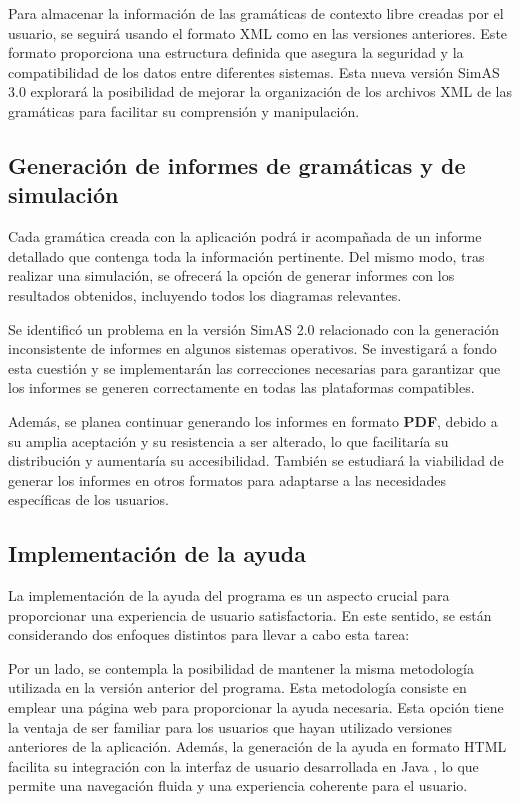 Para almacenar la información de las gramáticas de contexto libre creadas por el usuario, se seguirá usando el formato XML \cite{xml} como en las versiones anteriores. Este formato proporciona una estructura definida que asegura la seguridad y la compatibilidad de los datos entre diferentes sistemas. Esta nueva versión SimAS 3.0 explorará la posibilidad de mejorar la organización de los archivos XML de las gramáticas para facilitar su comprensión y manipulación.

\subsection{Generación de informes de gramáticas y de simulación}

Cada gramática creada con la aplicación podrá ir acompañada de un informe detallado que contenga toda la información pertinente. Del mismo modo, tras realizar una simulación, se ofrecerá la opción de generar informes con los resultados obtenidos, incluyendo todos los diagramas relevantes.

Se identificó un problema en la versión SimAS 2.0 relacionado con la generación inconsistente de informes en algunos sistemas operativos. Se investigará a fondo esta cuestión y se implementarán las correcciones necesarias para garantizar que los informes se generen correctamente en todas las plataformas compatibles. 

Además, se planea continuar generando los informes en formato \textbf{PDF}, debido a su amplia aceptación y su resistencia a ser alterado, lo que facilitaría su distribución y aumentaría su accesibilidad. También se estudiará la viabilidad de generar los informes en otros formatos para adaptarse a las necesidades específicas de los usuarios.

\subsection{Implementación de la ayuda}

La implementación de la ayuda del programa es un aspecto crucial para proporcionar una experiencia de usuario satisfactoria. En este sentido, se están considerando dos enfoques distintos para llevar a cabo esta tarea:

Por un lado, se contempla la posibilidad de mantener la misma metodología utilizada en la versión anterior del programa. Esta metodología consiste en emplear una página web para proporcionar la ayuda necesaria. Esta opción tiene la ventaja de ser familiar para los usuarios que hayan utilizado versiones anteriores de la aplicación. Además, la generación de la ayuda en formato HTML \cite{html} facilita su integración con la interfaz de usuario desarrollada en Java \cite{java}, lo que permite una navegación fluida y una experiencia coherente para el usuario.

